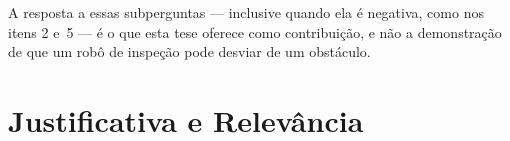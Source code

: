 A resposta a essas subperguntas --- inclusive quando ela é negativa, como nos itens 2
e~5 --- é o que esta tese oferece como contribuição, e não a demonstração de que um
robô de inspeção pode desviar de um obstáculo.



\section{Justificativa e Relevância}

